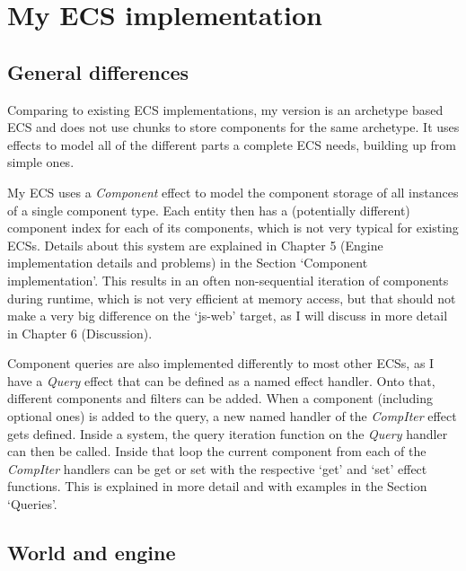 \chapter{My ECS implementation}\label{chap:ecs}

\section{General differences}

Comparing to existing ECS implementations, my version is an archetype based ECS and does not use chunks to store components for the same archetype. It uses effects to model all of the different parts a complete ECS needs, building up from simple ones.

My ECS uses a \textit{Component} effect to model the component storage of all instances of a single component type. Each entity then has a (potentially different) component index for each of its components, which is not very typical for existing ECSs. Details about this system are explained in Chapter 5 (Engine implementation details and problems) in the Section `Component implementation'. This results in an often non-sequential iteration of components during runtime, which is not very efficient at memory access, but that should not make a very big difference on the `js-web' target, as I will discuss in more detail in Chapter 6 (Discussion).

Component queries are also implemented differently to most other ECSs, as I have a \textit{Query} effect that can be defined as a named effect handler. Onto that, different components and filters can be added. When a component (including optional ones) is added to the query, a new named handler of the \textit{CompIter} effect gets defined. Inside a system, the query iteration function on the \textit{Query} handler can then be called. Inside that loop the current component from each of the \textit{CompIter} handlers can be get or set with the respective `get' and `set' effect functions. This is explained in more detail and with examples in the Section `Queries'.

\section{World and engine}


